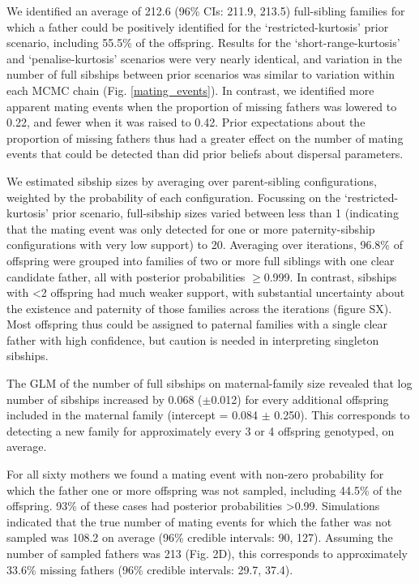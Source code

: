 \documentclass[10pt, a4paper, twocolumn]{article} %
\begin{document}
We identified an average of 212.6 (96\% CIs: 211.9, 213.5) full-sibling families for which a father could be positively identified for the ‘restricted-kurtosis’ prior scenario, including 55.5\% of the offspring. Results for the ‘short-range-kurtosis’ and ‘penalise-kurtosis’ scenarios were very nearly identical, and variation in the number of full sibships between prior scenarios was similar to variation within each MCMC chain (Fig. \ref{mating_events}). In contrast, we identified more apparent mating events when the proportion of missing fathers was lowered to 0.22, and fewer when it was raised to 0.42. Prior expectations about the proportion of missing fathers thus had a greater effect on the number of mating events that could be detected than did prior beliefs about dispersal parameters.

We estimated sibship sizes by averaging over parent-sibling configurations, weighted by the probability of each configuration. Focussing on the ‘restricted-kurtosis’ prior scenario, full-sibship sizes varied between less than 1 (indicating that the mating event was only detected for one or more paternity-sibship configurations with very low support) to 20. Averaging over iterations, 96.8\% of offspring were grouped into families of two or more full siblings with one clear candidate father, all with posterior probabilities $\geq$0.999. In contrast, sibships with <2 offspring had much weaker support, with substantial uncertainty about the existence and paternity of those families across the iterations (figure SX). Most offspring thus could be assigned to paternal families with a single clear father with high confidence, but caution is needed in interpreting singleton sibships.

The GLM of the number of full sibships on maternal-family size revealed that log number of sibships increased by 0.068 ($\pm$0.012) for every additional offspring included in the maternal family (intercept = 0.084 $\pm$ 0.250). This corresponds to detecting a new family for approximately every 3 or 4 offspring genotyped, on average.

For all sixty mothers we found a mating event with non-zero probability for which the father one or more offspring was not sampled, including 44.5\% of the offspring. 93\% of these cases had posterior probabilities >0.99. Simulations indicated that the true number of mating events for which the father was not sampled was 108.2 on average (96\% credible intervals: 90, 127). Assuming the number of sampled fathers was 213 (Fig. 2D), this corresponds to approximately 33.6\% missing fathers (96\% credible intervals: 29.7, 37.4).
\end{document}
